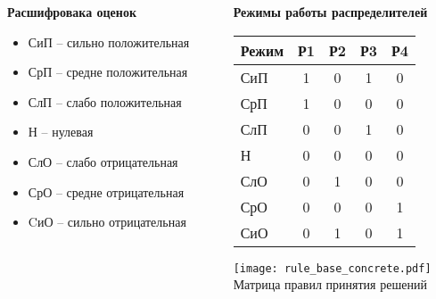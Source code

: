 \begin{frame}
\begin{columns}[T]
\begin{column}{0.48\textwidth}
			\begin{block}{\textbf {\scriptsize Расшифровака оценок}}
				\begin{itemize}
					\item СиП -- сильно положительная
					\item СрП -- средне положительная
					\item СлП -- слабо положительная
					\item Н -- нулевая
					\item СлО -- слабо отрицательная
					\item СрО -- средне отрицательная
					\item CиО -- сильно отрицательная
				\end{itemize}
			\end{block}
		\end{column}

		\begin{column}{0.48\textwidth}
			\textbf{Режимы работы распределителей}

			\centering
			\begin{tabular}{lcccc}
				\midrule
				\textbf{Режим} & \textbf{Р1} & \textbf{Р2} & \textbf{Р3} & \textbf{Р4} \\
				\midrule
				СиП            & 1           & 0           & 1           & 0           \\
				СрП            & 1           & 0           & 0           & 0           \\
				СлП            & 0           & 0           & 1           & 0           \\
				Н              & 0           & 0           & 0           & 0           \\
				СлО            & 0           & 1           & 0           & 0           \\
				СрО            & 0           & 0           & 0           & 1           \\
				СиО            & 0           & 1           & 0           & 1           \\
				\midrule
			\end{tabular}

			\vspace{0.3cm}

			\begin{center}
				\texttt{[image: rule\_base\_concrete.pdf]}
				\\Матрица правил принятия решений
			\end{center}
		\end{column}
	\end{columns}
\end{frame}


